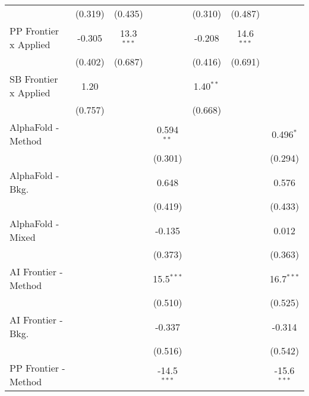 \begin{tabular}{lcccccc}
                                  & (0.319)        & (0.435)        &               & (0.310)        & (0.487)        &   \\   
   PP Frontier x Applied          & -0.305         & 13.3$^{***}$   &               & -0.208         & 14.6$^{***}$   &   \\   
                                  & (0.402)        & (0.687)        &               & (0.416)        & (0.691)        &   \\   
   SB Frontier x Applied          & 1.20           &                &               & 1.40$^{**}$    &                &   \\   
                                  & (0.757)        &                &               & (0.668)        &                &   \\   
   AlphaFold - Method             &                &                & 0.594$^{**}$  &                &                & 0.496$^{*}$\\   
                                  &                &                & (0.301)       &                &                & (0.294)\\   
   AlphaFold - Bkg.               &                &                & 0.648         &                &                & 0.576\\   
                                  &                &                & (0.419)       &                &                & (0.433)\\   
   AlphaFold - Mixed              &                &                & -0.135        &                &                & 0.012\\   
                                  &                &                & (0.373)       &                &                & (0.363)\\   
   AI Frontier - Method           &                &                & 15.5$^{***}$  &                &                & 16.7$^{***}$\\   
                                  &                &                & (0.510)       &                &                & (0.525)\\   
   AI Frontier - Bkg.             &                &                & -0.337        &                &                & -0.314\\   
                                  &                &                & (0.516)       &                &                & (0.542)\\   
   PP Frontier - Method           &                &                & -14.5$^{***}$ &                &                & -15.6$^{***}$\\   

\end{tabular}
